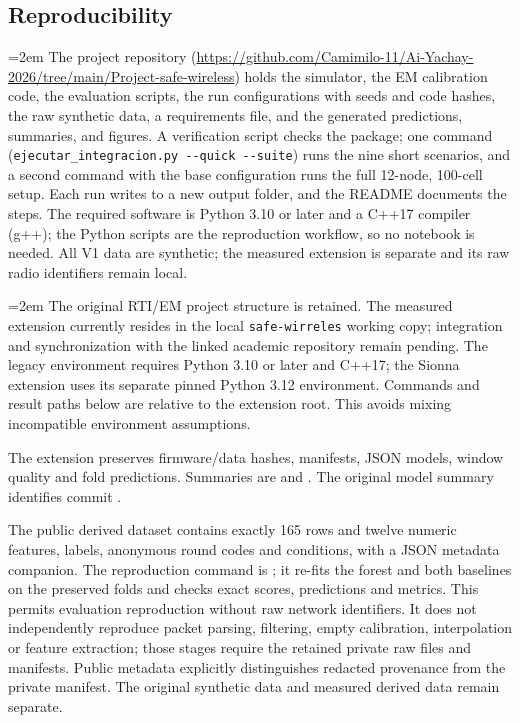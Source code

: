 \documentclass[sensors,article,submit,oneauthor]{Definitions/mdpi}
\begin{document}
\subsection{Reproducibility}

\begingroup\sloppy\emergencystretch=2em
The project repository (\url{https://github.com/Camimilo-11/Ai-Yachay-2026/tree/main/Project-safe-wireless}) holds the simulator, the EM calibration code, the evaluation scripts, the run configurations with seeds and code hashes, the raw synthetic data, a requirements file, and the generated predictions, summaries, and figures. A verification script checks the package; one command (\texttt{ejecutar\_integracion.py -{}-quick -{}-suite}) runs the nine short scenarios, and a second command with the base configuration runs the full 12-node, 100-cell setup. Each run writes to a new output folder, and the README documents the steps. The required software is Python 3.10 or later and a C++17 compiler (g++); the Python scripts are the reproduction workflow, so no notebook is needed. All V1 data are synthetic; the measured extension is separate and its raw radio identifiers remain local.\par\endgroup

\begingroup\sloppy\emergencystretch=2em
The original RTI/EM project structure is retained. The measured extension currently resides in the local \texttt{safe-wirreles} working copy; integration and synchronization with the linked academic repository remain pending. The legacy environment requires Python 3.10 or later and C++17; the Sionna extension uses its separate pinned Python 3.12 environment. Commands and result paths below are relative to the extension root. This avoids mixing incompatible environment assumptions.

The extension preserves firmware/data hashes, manifests, JSON models, window quality and fold predictions. Summaries are  and . The original model summary identifies commit \texttt{}.

The public derived dataset  contains exactly 165 rows and twelve numeric features, labels, anonymous round codes and conditions, with a JSON metadata companion. The reproduction command is ; it re-fits the forest and both baselines on the preserved folds and checks exact scores, predictions and metrics. This permits evaluation reproduction without raw network identifiers. It does not independently reproduce packet parsing, filtering, empty calibration, interpolation or feature extraction; those stages require the retained private raw files and manifests. Public metadata explicitly distinguishes redacted provenance from the private manifest. The original synthetic data and measured derived data remain separate.
\par\endgroup
\end{document}
